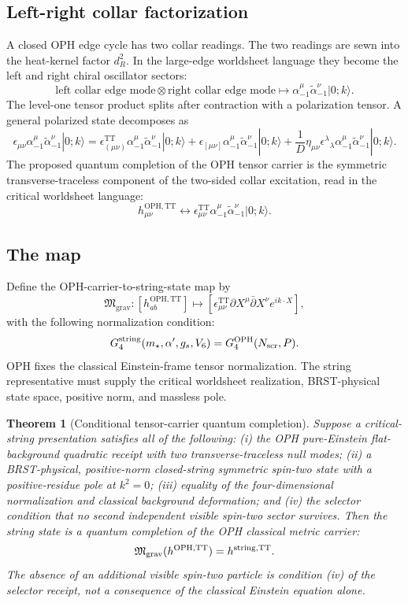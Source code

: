 \documentclass[11pt]{article}
\newtheorem{theorem}{Theorem}[section]
\theoremstyle{remark}
\theoremstyle{plain}
\newcommand{\OPH}{\mathrm{OPH}}
\newcommand{\Mgrav}{\mathfrak M_{\mathrm{grav}}}
\newcommand{\TT}{\mathrm{TT}}
\begin{document}
\subsection{Left-right collar factorization}

A closed OPH edge cycle has two collar readings. The two readings are sewn into the heat-kernel
factor \(d_R^2\). In the large-edge worldsheet language they become the left and right chiral
oscillator sectors:
\[
\text{left collar edge mode}\otimes\text{right collar edge mode}
\longmapsto
\alpha_{-1}^{\mu}\tilde\alpha_{-1}^{\nu}|0;k\rangle .
\]
The level-one tensor product splits after contraction with a polarization tensor. A general
polarized state decomposes as
\[
\epsilon_{\mu\nu}\alpha_{-1}^{\mu}\tilde\alpha_{-1}^{\nu}|0;k\rangle
=
\epsilon^{\TT}_{(\mu\nu)}\alpha_{-1}^{\mu}\tilde\alpha_{-1}^{\nu}|0;k\rangle
+
\epsilon_{[\mu\nu]}\alpha_{-1}^{\mu}\tilde\alpha_{-1}^{\nu}|0;k\rangle
+
\frac1D\eta_{\mu\nu}\epsilon^\lambda{}_{\lambda}
\alpha_{-1}^{\mu}\tilde\alpha_{-1}^{\nu}|0;k\rangle .
\]
The proposed quantum completion of the OPH tensor carrier is the symmetric
transverse-traceless component of the two-sided collar excitation, read in the critical worldsheet
language:
\[
h_{\mu\nu}^{\OPH,\TT}
\longleftrightarrow
\epsilon_{\mu\nu}^{\TT}\alpha_{-1}^{\mu}\tilde\alpha_{-1}^{\nu}|0;k\rangle .
\]

\subsection{The map}

Define the OPH-carrier-to-string-state map by
\[
\Mgrav:
[h_{ab}^{\OPH,\TT}]
\longmapsto
[\epsilon^{\TT}_{\mu\nu}\partial X^\mu\bar\partial X^\nu e^{ik\cdot X}],
\]
with the following normalization condition:
\[
G_4^{\rm string}(m_\star,\alpha',g_s,V_6)
=
G_4^{\OPH}(N_{\rm scr},P).
\]
OPH fixes the classical Einstein-frame tensor normalization. The string representative must supply
the critical worldsheet realization, BRST-physical state space, positive norm, and massless pole.

\begin{theorem}[Conditional tensor-carrier quantum completion]
Suppose a critical-string presentation satisfies all of the following: (i) the OPH pure-Einstein
flat-background quadratic receipt with two transverse-traceless null modes; (ii) a BRST-physical,
positive-norm closed-string symmetric spin-two state with a positive-residue pole at \(k^2=0\);
(iii) equality of the four-dimensional normalization and classical background deformation; and
(iv) the selector condition that no second independent visible spin-two sector survives. Then the
string state is a quantum completion of the OPH classical metric carrier:
\[
\Mgrav(h^{\OPH,\TT})=h^{\rm string,\TT}.
\]
The absence of an additional visible spin-two particle is condition (iv) of the selector receipt,
not a consequence of the classical Einstein equation alone.
\end{theorem}
\end{document}
